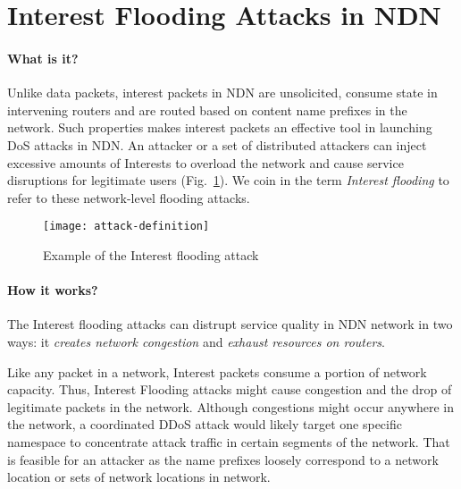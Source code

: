 \section{Interest Flooding Attacks in NDN}
\label{sec:interest flooding}



\paragraph{What is it?}

Unlike data packets, interest packets in NDN are unsolicited, consume state in intervening routers and are routed based on content name prefixes in the network. Such properties makes interest packets an effective tool in launching DoS attacks in NDN. An attacker or a set of distributed attackers can inject excessive amounts of Interests to overload the network and cause service disruptions for legitimate users (Fig.~\ref{fig:flooding example}). We coin in the term \emph{Interest flooding} to refer to these network-level flooding attacks.

\begin{figure}[htbp]
  \centering
  \texttt{[image: attack-definition]}
  \caption{Example of the Interest flooding attack}
  \label{fig:flooding example}
\end{figure}

\paragraph{How it works?}

The Interest flooding attacks can distrupt service quality in NDN network in two ways: it \emph{creates network congestion} and \emph{exhaust resources on routers}.

Like any packet in a network, Interest packets consume a portion of network capacity. Thus, Interest Flooding attacks might cause congestion and the drop of legitimate packets in the network. Although congestions might occur anywhere in the network, a coordinated DDoS attack would likely target one specific namespace to concentrate attack traffic in certain segments of the network. That is feasible for an attacker as the name prefixes loosely correspond to a network location or sets of network locations in network. 

